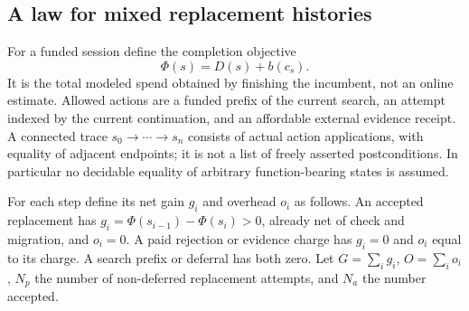 \documentclass[10pt,letterpaper]{article}
\begin{document}
\subsection{A law for mixed replacement histories}
For a funded session define the completion objective
\begin{equation}\label{eq:root-objective}
 \Phi(s)=D(s)+b(c_s).
\end{equation}
It is the total modeled spend obtained by finishing the incumbent, not an online estimate. Allowed actions are a funded prefix of the current search, an attempt indexed by the current continuation, and an affordable external evidence receipt. A connected trace $s_0\to\cdots\to s_n$ consists of actual action applications, with equality of adjacent endpoints; it is not a list of freely asserted postconditions. In particular no decidable equality of arbitrary function-bearing states is assumed.

For each step define its net gain $g_i$ and overhead $o_i$ as follows. An accepted replacement has $g_i=\Phi(s_{i-1})-\Phi(s_i)>0$, already net of check and migration, and $o_i=0$. A paid rejection or evidence charge has $g_i=0$ and $o_i$ equal to its charge. A search prefix or deferral has both zero. Let $G=\sum_i g_i$, $O=\sum_i o_i$, $N_p$ the number of non-deferred replacement attempts, and $N_a$ the number accepted.
\end{document}
